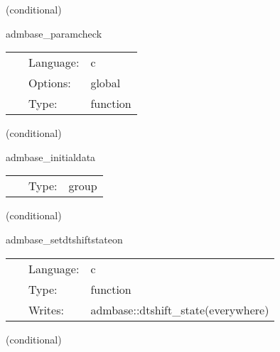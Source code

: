    (conditional) 

\hspace{5mm} admbase\_paramcheck 

\hspace{5mm}{\it check consistency of parameters } 


\hspace{5mm}

 \begin{tabular*}{160mm}{cll} 
~ & Language:  & c \\ 
~ & Options:  & global \\ 
~ & Type:  & function \\ 
\end{tabular*} 


\vspace{5mm}

   (conditional) 

\hspace{5mm} admbase\_initialdata 

\hspace{5mm}{\it schedule group for calculating adm initial data } 


\hspace{5mm}

 \begin{tabular*}{160mm}{cll} 
~ & Type:  & group \\ 
\end{tabular*} 


\vspace{5mm}

   (conditional) 

\hspace{5mm} admbase\_setdtshiftstateon 

\hspace{5mm}{\it set the dtshift\_state variable to 1 } 


\hspace{5mm}

 \begin{tabular*}{160mm}{cll} 
~ & Language:  & c \\ 
~ & Type:  & function \\ 
~ & Writes:  & admbase::dtshift\_state(everywhere) \\ 
\end{tabular*} 


\vspace{5mm}

   (conditional) 

